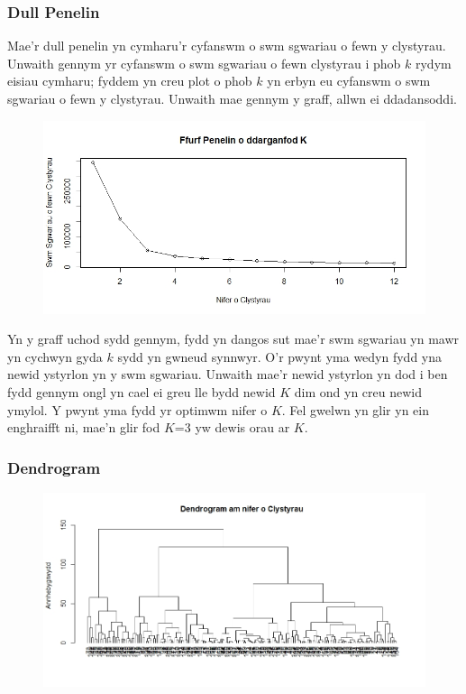 \subsubsection{Dull Penelin}

Mae'r dull penelin yn cymharu'r cyfanswm o swm sgwariau o fewn y clystyrau. Unwaith gennym yr cyfanswm o swm sgwariau o fewn clystyrau i phob $k$ rydym eisiau cymharu; fyddem yn creu plot o phob $k$ yn erbyn eu cyfanswm o swm sgwariau o fewn y clystyrau. Unwaith mae gennym y graff, allwn ei ddadansoddi. 

\begin{figure}[h]
\begin{center}
\includegraphics[width=0.5\linewidth]{../img/Dull_Penelin.jpeg}
\end{center}
\end{figure}

Yn y graff uchod sydd gennym, fydd yn dangos sut mae'r swm sgwariau yn mawr yn cychwyn gyda $k$ sydd yn gwneud synnwyr. O'r pwynt yma wedyn fydd yna newid ystyrlon yn y swm sgwariau. Unwaith mae'r newid ystyrlon yn dod i ben fydd gennym ongl yn cael ei greu lle bydd newid $K$ dim ond yn creu newid ymylol. Y pwynt yma fydd yr optimwm nifer o $K$. Fel gwelwn yn glir yn ein enghraifft ni, mae'n glir fod $K$=3 yw dewis orau ar $K$.

\subsubsection{Dendrogram}

\begin{figure}[h]
\begin{center}
\includegraphics[width=0.5\linewidth]{../img/Dendrogram.jpeg}
\end{center}
\end{figure}


